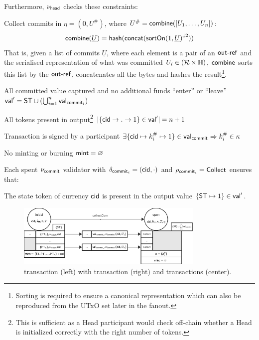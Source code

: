 \begin{samepage}
\noindent Furthermore, $\nu_\mathsf{head}$ checks these constraints:
\begin{menumerate}
  \item Collect commits in $\eta = (0, U^{\#})$, where
  $U^{\#} = \mathsf{combine}([U_{1}, \dots, U_{n}])$:
  \[
    \mathsf{combine}(\underline{U}) = \mathsf{hash}(\mathsf{concat}({\mathsf{sortOn}(1, \underline{U})}^{\downarrow2}))
  \]
  That is, given a list of commits $\underline{U}$, where each element is a pair
  of an $\mathsf{out\textsf{-}{}ref}$ and the serialised representation of what was committed
  $U_{i} \in (\mathcal{R} \times \mathbb{H})$, $\mathsf{combine}$ sorts this list by the
  $\mathsf{out\textsf{-}{}ref}$, concatenates all the bytes and hashes the
  result\footnote{Sorting is required to ensure a canonical representation
    which can also be reproduced from the UTxO set later in the fanout.}.

  \item All committed value captured and no additional funds ``enter'' or ``leave''\\
  $\mathsf{val}' = \mathsf{ST} \cup (\bigcup_{i=1}^{n} \mathsf{val}_{\mathsf{commit}_{i}})$
  \item All tokens present in output\footnote{This is sufficient as a Head participant would check off-chain whether a Head is initialized correctly with the right number of tokens.}
  $|\{\mathsf{cid} \rightarrow . \rightarrow 1\} \in \mathsf{val}'| = n + 1$
  \item Transaction is signed by a participant $\exists \{\mathsf{cid} \mapsto k^{\#}_{i} \mapsto 1\} \in \mathsf{val}_{\mathsf{commit}_{}} \Rightarrow k^{\#}_{i} \in \kappa$
  \item No minting or burning  $\mathsf{mint} = \varnothing$
\end{menumerate}
\end{samepage}

\noindent Each spent $\nu_{\mathsf{commit}}$ validator with $\delta_{\mathsf{commit}_{i}} = (\mathsf{cid},\cdot)$ and $\rho_{\mathsf{commit}_{i}} = \mathsf{Collect}$ ensures that:
\begin{menumerate}
  \item The state token of currency $\mathsf{cid}$ is present in the output value
  $\{\mathsf{ST} \mapsto 1\} \in \mathsf{val}'$.
\end{menumerate}

\begin{figure}[h]
  \centering
  \includegraphics[width=0.8\textwidth]{figures/SM-collect.pdf}
  \caption{\mtxInit{} transaction (left) with \mtxCCom{} transaction (right) and
    \mtxCom{} transactions (center).}\label{fig:SM-collect}
\end{figure}

